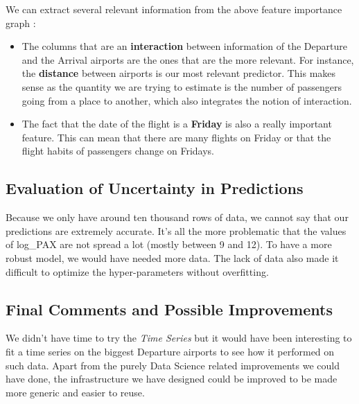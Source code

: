 \documentclass[a4paper,12pt,twoside]{article}
\begin{document}
We can extract several relevant information from the above feature importance graph :

\begin{itemize}
	\item The columns that are an \textbf{interaction} between information of the Departure and the Arrival airports are the ones that are the more relevant. For instance, the \textbf{distance} between airports is our most relevant predictor. This makes sense as the quantity we are trying to estimate is the number of passengers going from a place to another, which also integrates the notion of interaction.
	\item The fact that the date of the flight is a \textbf{Friday} is also a really important feature. This can mean that there are many flights on Friday or that the flight habits of passengers change on Fridays.
\end{itemize}

\subsection{Evaluation of Uncertainty in Predictions}

Because we only have around ten thousand rows of data, we cannot say that our predictions are extremely accurate. It's all the more problematic that the values of log\_PAX are not spread a lot (mostly between 9 and 12). To have a more robust model, we would have needed more data. The lack of data also made it difficult to optimize the hyper-parameters without overfitting.


\subsection{Final Comments and Possible Improvements}

We didn't have time to try the \textit{Time Series} but it would have been interesting to fit a time series on the biggest Departure airports to see how it performed on such data.
Apart from the purely Data Science related improvements we could have done, the infrastructure we have designed could be improved to be made more generic and easier to reuse.
\end{document}
